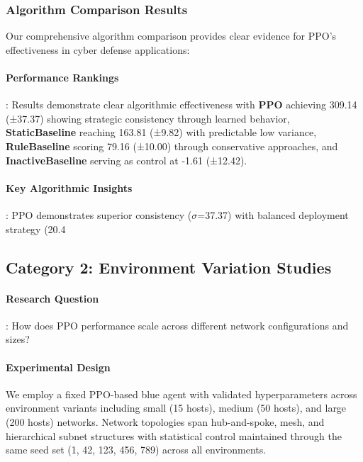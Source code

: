 \documentclass[12pt,oneside]{article}
\begin{document}
\subsubsection{Algorithm Comparison Results}

Our comprehensive algorithm comparison provides clear evidence for PPO's effectiveness in cyber defense applications:

\paragraph{Performance Rankings}: Results demonstrate clear algorithmic effectiveness with \textbf{PPO} achieving 309.14 (±37.37) showing strategic consistency through learned behavior, \textbf{StaticBaseline} reaching 163.81 (±9.82) with predictable low variance, \textbf{RuleBaseline} scoring 79.16 (±10.00) through conservative approaches, and \textbf{InactiveBaseline} serving as control at -1.61 (±12.42).

\paragraph{Key Algorithmic Insights}: PPO demonstrates superior consistency ($\sigma$=37.37) with balanced deployment strategy (20.4%

\subsection{Category 2: Environment Variation Studies}

\paragraph{Research Question}: How does PPO performance scale across different network configurations and sizes?

\paragraph{Experimental Design} We employ a fixed PPO-based blue agent with validated hyperparameters across environment variants including small (15 hosts), medium (50 hosts), and large (200 hosts) networks. Network topologies span hub-and-spoke, mesh, and hierarchical subnet structures with statistical control maintained through the same seed set (1, 42, 123, 456, 789) across all environments.
\end{document}
